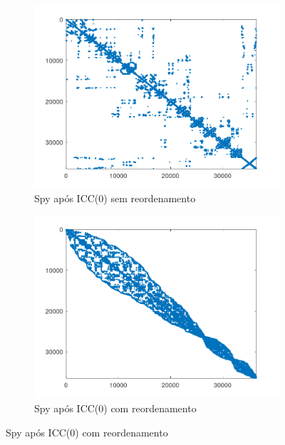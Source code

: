\begin{figure}[H]
    \centering
    \begin{subfigure}[t]{0.4\linewidth}
         \centering
         \includegraphics[width=\textwidth]{images/pdb1HYS_spyM_ICC(0)_sem.png}
         \caption{Spy após ICC(0) sem reordenamento}
         \label{fig:pdb-icc0-sem}
    \end{subfigure}
    \quad
    \begin{subfigure}[t]{0.4\linewidth}
         \centering
         \includegraphics[width=\textwidth]{images/pdb1HYS_spyM_ICC(0)_com.png}
         \caption{Spy após ICC(0) com reordenamento}
         \label{fig:pdb-icc0-com}
    \end{subfigure}
    \label{fig:pdb}
\end{figure}
